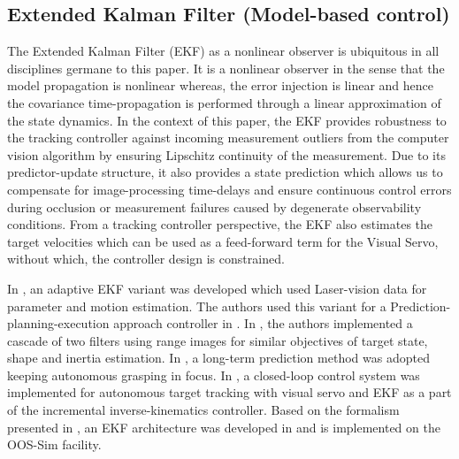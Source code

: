 %	
%
%
\subsection{Extended Kalman Filter (Model-based control)}
The Extended Kalman Filter (EKF) as a nonlinear observer is ubiquitous in all disciplines germane to this paper. It is a nonlinear observer in the sense that the model propagation is nonlinear whereas, the error injection is linear and hence the covariance time-propagation is performed through a linear approximation of the state dynamics. In the context of this paper, the EKF provides robustness to the tracking controller against incoming measurement outliers from the computer vision algorithm by ensuring Lipschitz continuity of the measurement. Due to its predictor-update structure, it also provides a state prediction which allows us to compensate for image-processing time-delays and ensure continuous control errors during occlusion or measurement failures caused by degenerate observability conditions. From a tracking controller perspective, the EKF also estimates the target velocities which can be used as a feed-forward term for the Visual Servo, without which, the controller design is constrained. 

In \cite{Aghili07}, an adaptive EKF variant was developed which used Laser-vision data for parameter and motion estimation. The authors used this variant for a Prediction-planning-execution approach controller in \cite{Aghili08}. In \cite{Dubowsky}, the authors implemented a cascade of two filters using range images for similar objectives of target state, shape and inertia estimation. In \cite{DLR01}, a long-term prediction method was adopted keeping autonomous grasping in focus. In \cite{RIS0}, a closed-loop control system was implemented for autonomous target tracking with visual servo and EKF as a part of the incremental inverse-kinematics controller. Based on the formalism presented in \cite{Aghili07}, an EKF architecture was developed in \cite{Selfthesis} and is implemented on the OOS-Sim facility.

